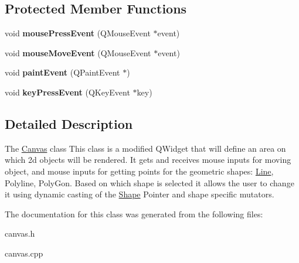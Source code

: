 \subsection*{Protected Member Functions}
\begin{DoxyCompactItemize}
\item 
\mbox{\label{class_canvas_abc2200972cf33fd8991d4759955eb0d8}} 
void {\bfseries mouse\+Press\+Event} (Q\+Mouse\+Event $\ast$event)
\item 
\mbox{\label{class_canvas_a9fb4b83a1067ddc2aa04676f51dc5a47}} 
void {\bfseries mouse\+Move\+Event} (Q\+Mouse\+Event $\ast$event)
\item 
\mbox{\label{class_canvas_a0e5ff2b8662659da1687eb31ad41d119}} 
void {\bfseries paint\+Event} (Q\+Paint\+Event $\ast$)
\item 
\mbox{\label{class_canvas_a3bcc6c012c67e727125cf2d138e944b8}} 
void {\bfseries key\+Press\+Event} (Q\+Key\+Event $\ast$key)
\end{DoxyCompactItemize}


\subsection{Detailed Description}
The \hyperlink{class_canvas}{Canvas} class This class is a modified Q\+Widget that will define an area on which 2d objects will be rendered. It gets and receives mouse inputs for moving object, and mouse inputs for getting points for the geometric shapes\+: \hyperlink{class_line}{Line}, Polyline, Poly\+Gon. Based on which shape is selected it allows the user to change it using dynamic casting of the \hyperlink{class_shape}{Shape} Pointer and shape specific mutators. 

The documentation for this class was generated from the following files\+:\begin{DoxyCompactItemize}
\item 
canvas.\+h\item 
canvas.\+cpp\end{DoxyCompactItemize}
